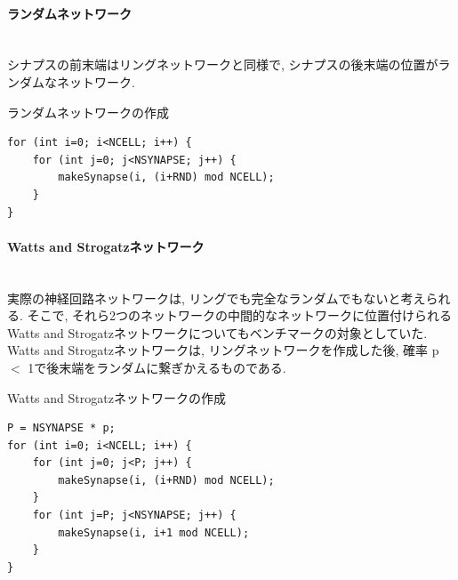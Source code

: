 \paragraph{ランダムネットワーク}~\\
シナプスの前末端はリングネットワークと同様で, シナプスの後末端の位置がランダムなネットワーク.
\begin{table}[htb]
\caption {ランダムネットワークの作成}
{\footnotesize
\begin{framed}
\begin{verbatim}
for (int i=0; i<NCELL; i++) {
    for (int j=0; j<NSYNAPSE; j++) {
        makeSynapse(i, (i+RND) mod NCELL);
    }
}
\end{verbatim}
\end{framed}
}
\end{table}
\paragraph{Watts and Strogatzネットワーク}~\\
実際の神経回路ネットワークは, リングでも完全なランダムでもないと考えられる.
そこで, それら2つのネットワークの中間的なネットワークに位置付けられるWatts and Strogatzネットワークについてもベンチマークの対象としていた.
Watts and Strogatzネットワークは, リングネットワークを作成した後, 確率 p $<$ 1で後末端をランダムに繋ぎかえるものである.

\begin{table}[htb]
\caption {Watts and Strogatzネットワークの作成}
{\footnotesize
\begin{framed}
\begin{verbatim}
P = NSYNAPSE * p;
for (int i=0; i<NCELL; i++) {
    for (int j=0; j<P; j++) {
        makeSynapse(i, (i+RND) mod NCELL);
    }
    for (int j=P; j<NSYNAPSE; j++) {
        makeSynapse(i, i+1 mod NCELL);
    }
}
\end{verbatim}
\end{framed}
}
\end{table}
\vspace{1cm}
